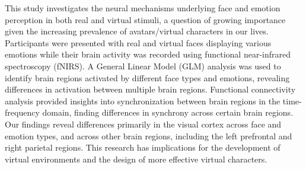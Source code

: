 This study investigates the neural mechanisms underlying face and emotion perception in both real and virtual stimuli, a question of growing importance given the increasing prevalence of avatars/virtual characters in our lives. 
Participants were presented with real and virtual faces displaying various emotions while their brain activity was recorded using functional near-infrared spectroscopy (fNIRS).
A General Linear Model (GLM) analysis was used to identify brain regions activated by different face types and emotions, revealing differences in activation between multiple brain regions. 
Functional connectivity analysis provided insights into synchronization between brain regions in the time-frequency domain, finding differences in synchrony across certain brain regions. 
Our findings reveal differences primarily in the visual cortex across face and emotion types, and across other brain regions, including the left prefrontal and right parietal regions. 
This research has implications for the development of virtual environments and the design of more effective virtual characters.
